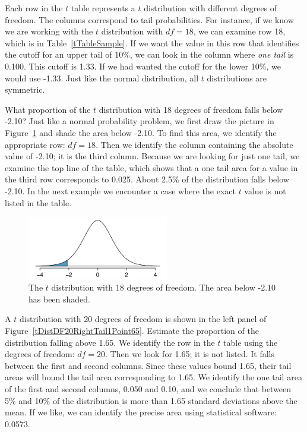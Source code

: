 Each row in the $t$ table represents a $t$ distribution with different degrees of freedom. The columns correspond to tail probabilities. For instance, if we know we are working with the $t$ distribution with $df=18$, we can examine row 18, which is  in Table~\ref{tTableSample}. If we want the value in this row that identifies the cutoff for an upper tail of 10\%, we can look in the column where \emph{one tail} is 0.100. This cutoff is 1.33. If we had wanted the cutoff for the lower 10\%, we would use -1.33. Just like the normal distribution, all $t$ distributions are symmetric.

\begin{example}{What proportion of the $t$ distribution with 18 degrees of freedom falls below -2.10?}
Just like a normal probability problem, we first draw the picture in Figure~\ref{tDistDF18LeftTail2Point10} and shade the area below -2.10. To find this area, we identify the appropriate row: $df=18$. Then we identify the column containing the absolute value of -2.10; it is the third column. Because we are looking for just one tail, we examine the top line of the table, which shows that a one tail area for a value in the third row corresponds to 0.025. About 2.5\% of the distribution falls below -2.10. In the next example we encounter a case where the exact $t$ value is not listed in the table.
\end{example}

\begin{figure}
\centering
\includegraphics[width=0.55\textwidth]{05/figures/tDistDF18LeftTail2Point10/tDistDF18LeftTail2Point10}
\caption{The $t$ distribution with 18 degrees of freedom. The area below -2.10 has been shaded.}
\label{tDistDF18LeftTail2Point10}
\end{figure}

\textB{\pagebreak}

\begin{example}{A $t$ distribution with 20 degrees of freedom is shown in the left panel of Figure~\ref{tDistDF20RightTail1Point65}. Estimate the proportion of the distribution falling above 1.65.}
We identify the row in the $t$ table using the degrees of freedom: $df=20$. Then we look for 1.65; it is not listed. It falls between the first and second columns. Since these values bound 1.65, their tail areas will bound the tail area corresponding to 1.65. We identify the one tail area of the first and second columns, 0.050 and 0.10, and we conclude that between 5\% and 10\% of the distribution is more than 1.65 standard deviations above the mean. If we like, we can identify the precise area using statistical software: 0.0573.
\end{example}

